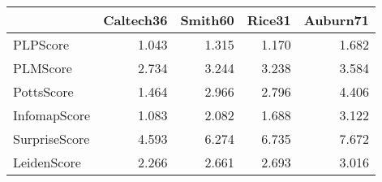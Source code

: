 \begin{tabular}{lrrrr}
\toprule
{} & Caltech36 & Smith60 & Rice31 & Auburn71 \\
\midrule
PLPScore      &     1.043 &   1.315 &  1.170 &    1.682 \\
PLMScore      &     2.734 &   3.244 &  3.238 &    3.584 \\
PottsScore    &     1.464 &   2.966 &  2.796 &    4.406 \\
InfomapScore  &     1.083 &   2.082 &  1.688 &    3.122 \\
SurpriseScore &     4.593 &   6.274 &  6.735 &    7.672 \\
LeidenScore   &     2.266 &   2.661 &  2.693 &    3.016 \\
\bottomrule
\end{tabular}
